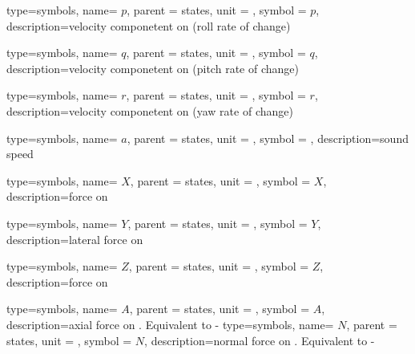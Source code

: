 {type=symbols,
    name= \ensuremath{p},
    parent = {states},
    unit = \unexpanded{\si{\radian\per\second}},
    symbol = \ensuremath{p},
    description={velocity componetent on  (roll rate of change)}
}

{type=symbols,
    name= \ensuremath{q},
    parent = {states},
    unit = \unexpanded{\si{\radian\per\second}},
    symbol = \ensuremath{q},
    description={velocity componetent on  (pitch rate of change)}
}

{type=symbols,
    name= \ensuremath{r},
    parent = {states},
    unit = \unexpanded{\si{\radian\per\second}},
    symbol = \ensuremath{r},
    description={velocity componetent on  (yaw rate of change)}
}

{type=symbols,
    name= \ensuremath{a},
    parent = {states},
    unit = \unexpanded{\si{\meter\per\second}},
    symbol = ,
    description={sound speed}
}

{type=symbols,
    name= \ensuremath{X},
    parent = {states},
    unit = \unexpanded{\si{\newton}},
    symbol = \ensuremath{X},
    description={force on }
}

{type=symbols,
    name= \ensuremath{Y},
    parent = {states},
    unit = \unexpanded{\si{\newton}},
    symbol = \ensuremath{Y},
    description={lateral force on }
}



{type=symbols,
    name= \ensuremath{Z},
    parent = {states},
    unit = \unexpanded{\si{\newton}},
    symbol = \ensuremath{Z},
    description={force on }
}

{type=symbols,
    name= \ensuremath{A},
    parent = {states},
    unit = \unexpanded{\si{\newton}},
    symbol = \ensuremath{A},
    description={axial force on . Equivalent to -}
}
{type=symbols,
    name= \ensuremath{N},
    parent = {states},
    unit = \unexpanded{\si{\newton}},
    symbol = \ensuremath{N},
    description={normal force on . Equivalent to -}
}



